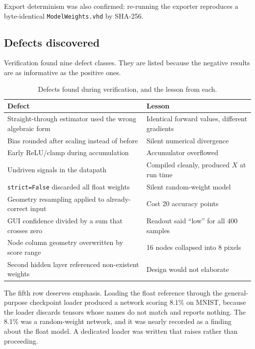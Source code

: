 \documentclass[11pt,a4paper]{article}
\begin{document}
Export determinism was also confirmed: re-running the exporter reproduces a
byte-identical \texttt{ModelWeights.vhd} by SHA-256.

\subsection{Defects discovered}
\label{sec:defects}

Verification found nine defect classes. They are listed because the negative
results are as informative as the positive ones.

\begin{table}[H]
\centering
\small
\caption{Defects found during verification, and the lesson from each.}
\label{tab:defects}
\begin{tabular}{@{}p{}p{}@{}}
\toprule
\textbf{Defect} & \textbf{Lesson} \\
\midrule
Straight-through estimator used the wrong algebraic form & Identical forward
values, different gradients \\
Bias rounded after scaling instead of before & Silent numerical divergence \\
Early ReLU/clamp during accumulation & Accumulator overflowed \\
Undriven signals in the datapath & Compiled cleanly, produced $X$ at run time \\
\texttt{strict=False} discarded all float weights & Silent random-weight model \\
Geometry resampling applied to already-correct input & Cost 20 accuracy points \\
GUI confidence divided by a sum that crosses zero & Readout said ``low'' for all 400 samples \\
Node column geometry overwritten by score range & 16 nodes collapsed into 8 pixels \\
Second hidden layer referenced non-existent weights & Design would not elaborate \\
\bottomrule
\end{tabular}
\end{table}

The fifth row deserves emphasis. Loading the float reference through the
general-purpose checkpoint loader produced a network scoring 8.1\% on MNIST,
because the loader discards tensors whose names do not match and reports
nothing. The 8.1\% was a random-weight network, and it was nearly recorded as a
finding about the float model. A dedicated loader was written that raises rather
than proceeding.
\end{document}
